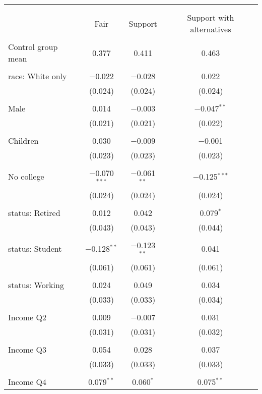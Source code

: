 
\begin{tabular}{@{\extracolsep{5pt}}lccc} 
\\[-1.8ex]\hline 
\hline \\[-1.8ex] 
\\[-1.8ex] & Fair & Support & Support with alternatives \\ 
\hline \\[-1.8ex] 
 Control group mean & 0.377 & 0.411 & 0.463  \\ \hline \\[-1.8ex] race: White only & $-$0.022 & $-$0.028 & 0.022 \\ 
  & (0.024) & (0.024) & (0.024) \\ 
  & & & \\ 
 Male & 0.014 & $-$0.003 & $-$0.047$^{**}$ \\ 
  & (0.021) & (0.021) & (0.022) \\ 
  & & & \\ 
 Children & 0.030 & $-$0.009 & $-$0.001 \\ 
  & (0.023) & (0.023) & (0.023) \\ 
  & & & \\ 
 No college & $-$0.070$^{***}$ & $-$0.061$^{**}$ & $-$0.125$^{***}$ \\ 
  & (0.024) & (0.024) & (0.024) \\ 
  & & & \\ 
 status: Retired & 0.012 & 0.042 & 0.079$^{*}$ \\ 
  & (0.043) & (0.043) & (0.044) \\ 
  & & & \\ 
 status: Student & $-$0.128$^{**}$ & $-$0.123$^{**}$ & 0.041 \\ 
  & (0.061) & (0.061) & (0.061) \\ 
  & & & \\ 
 status: Working & 0.024 & 0.049 & 0.034 \\ 
  & (0.033) & (0.033) & (0.034) \\ 
  & & & \\ 
 Income Q2 & 0.009 & $-$0.007 & 0.031 \\ 
  & (0.031) & (0.031) & (0.032) \\ 
  & & & \\ 
 Income Q3 & 0.054 & 0.028 & 0.037 \\ 
  & (0.033) & (0.033) & (0.033) \\ 
  & & & \\ 
 Income Q4 & 0.079$^{**}$ & 0.060$^{*}$ & 0.075$^{**}$ \\ 

\end{tabular}
